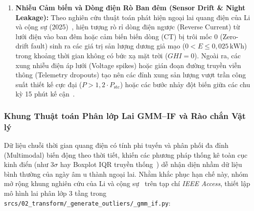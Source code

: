 \documentclass[12pt, a4paper]{report}
\begin{document}
\begin{enumerate}[label=\arabic*., leftmargin=*]
    \item \textbf{Nhiễu Cảm biến và Dòng điện Rò Ban đêm (Sensor Drift \& Night Leakage):}
    Theo nghiên cứu thuật toán phát hiện ngoại lai quang điện của Li và cộng sự (2025)~\cite{li2025gmmif}, hiện tượng rò rỉ dòng điện ngược (Reverse Current) từ lưới điện vào ban đêm hoặc cảm biến biến dòng (CT) bị trôi mốc 0 (Zero-drift fault) sinh ra các giá trị sản lượng dương giả mạo ($0 < E \le 0{,}025\,\text{kWh}$) trong khoảng thời gian không có bức xạ mặt trời ($GHI = 0$). Ngoài ra, các xung nhiễu điện áp lưới (Voltage spikes) hoặc gián đoạn đường truyền viễn thông (Telemetry dropouts) tạo nên các đỉnh xung sản lượng vượt trần công suất thiết kế cực đại ($P > 1{,}2 \cdot P_{\text{stc}}$) hoặc các bước nhảy đột biến giữa các chu kỳ 15 phút kế cận~\cite{wimalaratne2022unisolar, li2025gmmif}.
\end{enumerate}

\subsubsection{Khung Thuật toán Phân lớp Lai GMM--IF và Rào chắn Vật lý}
Dữ liệu chuỗi thời gian quang điện có tính phi tuyến và phân phối đa đỉnh (Multimodal) biến động theo thời tiết, khiến các phương pháp thống kê toàn cục kinh điển (như $3\sigma$ hay Boxplot IQR truyền thống~\cite{tukey1977eda}) dễ nhận diện nhầm dữ liệu bình thường của ngày âm u thành ngoại lai. Nhằm khắc phục hạn chế này, nhóm mở rộng khung nghiên cứu của Li và cộng sự~\cite{li2025gmmif} trên tạp chí \textit{IEEE Access}, thiết lập mô hình lai phân lớp 3 tầng trong \texttt{srcs/02\_transform/\_generate\_outliers/\_gmm\_if.py}:
\end{document}
